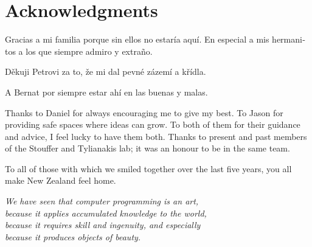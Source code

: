 {}
\chapter*{Acknowledgments}
\thispagestyle{empty}

\begin{otherlanguage}{spanish}
Gracias a mi familia porque sin ellos no estaría aquí.
En especial a mis hermanitos a los que siempre admiro y extraño.
\end{otherlanguage}
\begin{otherlanguage}{spanish}
Děkuji Petrovi za to, že mi dal pevné zázemí a křídla.
\end{otherlanguage}
\begin{otherlanguage}{spanish}
A Bernat por siempre estar ahí en las buenas y malas.
\end{otherlanguage}

Thanks to Daniel for always encouraging me to give my best.
To Jason for providing safe spaces where ideas can grow.
To both of them for their guidance and advice, I feel lucky to have them both.
Thanks to present and past members of the Stouffer and Tylianakis lab; it was an honour to be in the same team.

To all of those with which we smiled together over the last five years, you all make New Zealand feel home.

\begin{flushright}{\slshape
    We have seen that computer programming is an art, \\
    because it applies accumulated knowledge to the world, \\
    because it requires skill and ingenuity, and especially \\
    because it produces objects of beauty.} \\ \medskip
\end{flushright}
